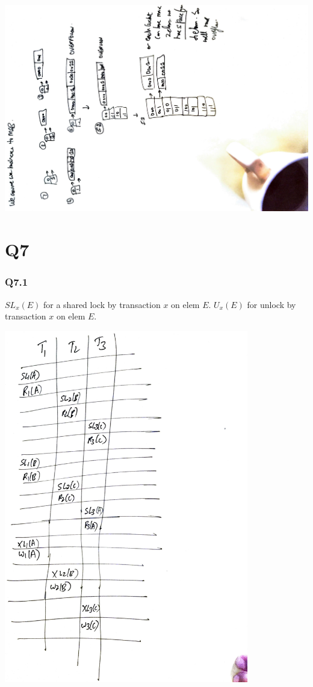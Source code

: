 \documentclass{article}
\begin{document}
\includegraphics[width=\textwidth, angle=270]{db-q6.pdf}

\section{Q7}
\subsubsection{Q7.1}
$SL_x(E)$ for a shared lock by transaction $x$ on elem $E$. $U_x(E)$ for
unlock by transaction $x$ on elem $E$.

\includegraphics[width=0.8\textwidth]{db-q71.pdf}
\end{document}
